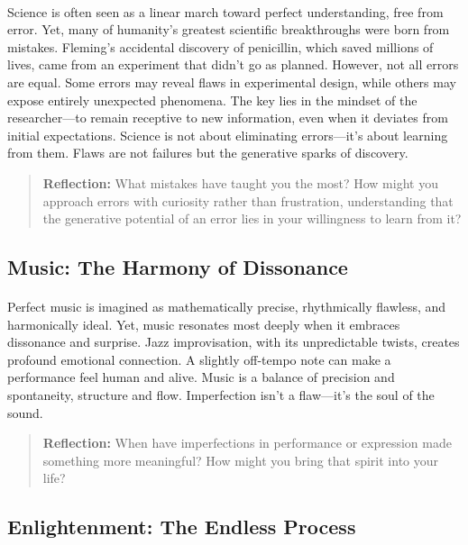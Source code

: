 \documentclass[12pt]{article}
\begin{document}
\paragraph{}
Science is often seen as a linear march toward perfect understanding, free from error. Yet, many of humanity’s greatest scientific breakthroughs were born from mistakes. Fleming’s accidental discovery of penicillin, which saved millions of lives, came from an experiment that didn’t go as planned. However, not all errors are equal. Some errors may reveal flaws in experimental design, while others may expose entirely unexpected phenomena. The key lies in the mindset of the researcher—to remain receptive to new information, even when it deviates from initial expectations. Science is not about eliminating errors—it’s about learning from them. Flaws are not failures but the generative sparks of discovery.

\begin{quote}
\textbf{Reflection:}
What mistakes have taught you the most? How might you approach errors with curiosity rather than frustration, understanding that the generative potential of an error lies in your willingness to learn from it?
\end{quote}

\subsection{Music: The Harmony of Dissonance}
\paragraph{}
Perfect music is imagined as mathematically precise, rhythmically flawless, and harmonically ideal. Yet, music resonates most deeply when it embraces dissonance and surprise. Jazz improvisation, with its unpredictable twists, creates profound emotional connection. A slightly off-tempo note can make a performance feel human and alive. Music is a balance of precision and spontaneity, structure and flow. Imperfection isn’t a flaw—it’s the soul of the sound.

\begin{quote}
\textbf{Reflection:}  
When have imperfections in performance or expression made something more meaningful? How might you bring that spirit into your life?
\end{quote}

\subsection{Enlightenment: The Endless Process}
\end{document}
